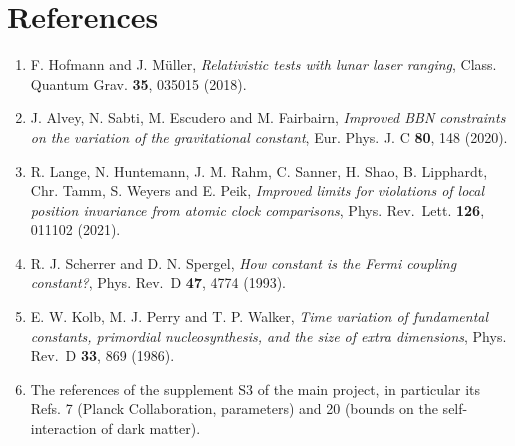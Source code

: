 \documentclass[
  10pt,
]{article}
\providecommand{\tightlist}{%
  \setlength{\itemsep}{0pt}\setlength{\parskip}{0pt}}
\begin{document}
\hypertarget{references}{%
\section{References}\label{references}}

\begin{enumerate}
\def\labelenumi{\arabic{enumi}.}
\tightlist
\item
  F. Hofmann and J. Müller, \emph{Relativistic tests with lunar laser
  ranging}, Class. Quantum Grav. \textbf{35}, 035015 (2018).
\item
  J. Alvey, N. Sabti, M. Escudero and M. Fairbairn, \emph{Improved BBN
  constraints on the variation of the gravitational constant}, Eur.
  Phys. J. C \textbf{80}, 148 (2020).
\item
  R. Lange, N. Huntemann, J. M. Rahm, C. Sanner, H. Shao, B. Lipphardt,
  Chr. Tamm, S. Weyers and E. Peik, \emph{Improved limits for violations
  of local position invariance from atomic clock comparisons}, Phys.
  Rev.~Lett. \textbf{126}, 011102 (2021).
\item
  R. J. Scherrer and D. N. Spergel, \emph{How constant is the Fermi
  coupling constant?}, Phys. Rev.~D \textbf{47}, 4774 (1993).
\item
  E. W. Kolb, M. J. Perry and T. P. Walker, \emph{Time variation of
  fundamental constants, primordial nucleosynthesis, and the size of
  extra dimensions}, Phys. Rev.~D \textbf{33}, 869 (1986).
\item
  The references of the supplement S3 of the main project, in particular
  its Refs. 7 (Planck Collaboration, parameters) and 20 (bounds on the
  self-interaction of dark matter).
\end{enumerate}
\end{document}
